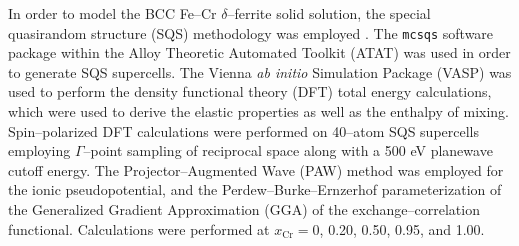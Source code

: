 \documentclass[final,3p,times]{elsarticle}
\begin{document}
In order to model the BCC Fe--Cr $\delta$--ferrite solid solution, the special quasirandom structure (SQS) methodology was employed \cite{VandeWalleLiu2013}.
The \texttt{mcsqs} software package within the Alloy Theoretic Automated Toolkit (ATAT) was used in order to generate SQS supercells.
The Vienna \textit{ab initio} Simulation Package (VASP) \cite{kresse1996vasp} was used to perform the density functional theory (DFT) total energy calculations, which were used to derive the elastic properties as well as the enthalpy of mixing.
Spin--polarized DFT calculations were performed on 40--atom SQS supercells employing $\Gamma$--point sampling of reciprocal space along with a 500 eV planewave cutoff energy.
The Projector--Augmented Wave (PAW) method \cite{kresse1999paw} was employed for the ionic pseudopotential, and the Perdew--Burke--Ernzerhof parameterization \cite{pbe1996} of the Generalized Gradient Approximation (GGA) of the exchange--correlation functional. Calculations were performed at $x_{\mathrm{Cr}} = 0$, 0.20, 0.50, 0.95, and 1.00.
\end{document}
